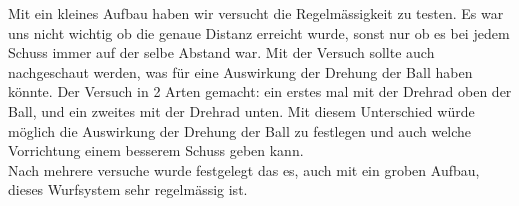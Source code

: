 Mit ein kleines Aufbau haben wir versucht die Regelmässigkeit zu testen. Es war uns nicht wichtig ob die genaue Distanz erreicht wurde, sonst nur ob es bei jedem Schuss immer auf der selbe Abstand war. Mit der Versuch sollte auch nachgeschaut werden, was für eine Auswirkung der Drehung der Ball haben könnte. Der Versuch in 2 Arten gemacht: ein erstes mal mit der Drehrad oben der Ball, und ein zweites mit der Drehrad unten. Mit diesem Unterschied würde möglich die Auswirkung der Drehung der Ball zu festlegen und auch welche Vorrichtung einem besserem Schuss geben kann.\\
Nach mehrere versuche wurde festgelegt das es, auch mit ein groben Aufbau, dieses Wurfsystem sehr regelmässig ist. \\

